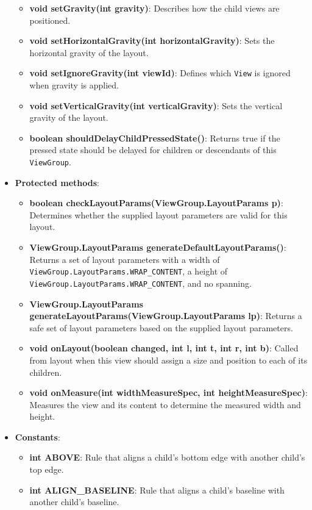 \documentclass{report}
\begin{document}
\begin{itemize}
\begin{itemize}
                \item \textbf{void setGravity(int gravity)}: Describes how the child views are positioned.
                \item \textbf{void setHorizontalGravity(int horizontalGravity)}: Sets the horizontal gravity of the layout.
                \item \textbf{void setIgnoreGravity(int viewId)}: Defines which \texttt{View} is ignored when gravity is applied.
                \item \textbf{void setVerticalGravity(int verticalGravity)}: Sets the vertical gravity of the layout.
                \item \textbf{boolean shouldDelayChildPressedState()}: Returns true if the pressed state should be delayed for children or descendants of this \texttt{ViewGroup}.
            \end{itemize}
        \item \textbf{Protected methods}:
            \begin{itemize}
                \item \textbf{boolean checkLayoutParams(ViewGroup.LayoutParams p)}: Determines whether the supplied layout parameters are valid for this layout.
                \item \textbf{ViewGroup.LayoutParams generateDefaultLayoutParams()}: Returns a set of layout parameters with a width of \texttt{ViewGroup.LayoutParams.WRAP\_CONTENT}, a height of \texttt{ViewGroup.LayoutParams.WRAP\_CONTENT}, and no spanning.
                \item \textbf{ViewGroup.LayoutParams generateLayoutParams(ViewGroup.LayoutParams lp)}: Returns a safe set of layout parameters based on the supplied layout parameters.
                \item \textbf{void onLayout(boolean changed, int l, int t, int r, int b)}: Called from layout when this view should assign a size and position to each of its children.
                \item \textbf{void onMeasure(int widthMeasureSpec, int heightMeasureSpec)}: Measures the view and its content to determine the measured width and height.
            \end{itemize}
        \item \textbf{Constants}:
            \begin{itemize}
                \item \textbf{int ABOVE}: Rule that aligns a child's bottom edge with another child's top edge.
                \item \textbf{int ALIGN\_BASELINE}: Rule that aligns a child's baseline with another child's baseline.

\end{itemize}
\end{itemize}
\end{document}
